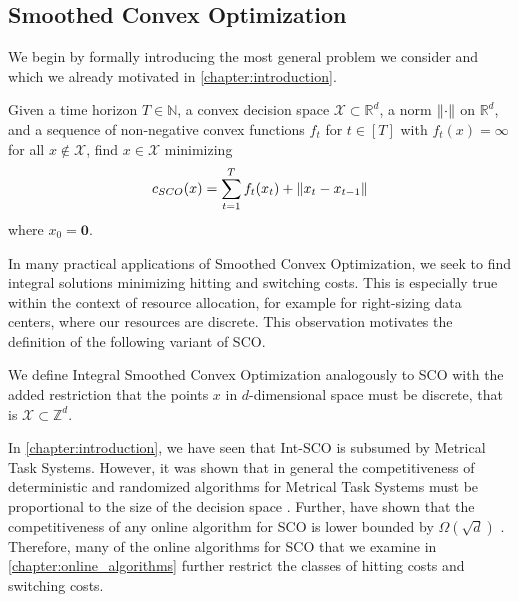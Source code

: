 \subsection{Smoothed Convex Optimization}

We begin by formally introducing the most general problem we consider and which we already motivated in \autoref{chapter:introduction}.

\begin{problem}
Given a time horizon $T \in \mathbb{N}$, a convex decision space $\mathcal{X} \subset \mathbb{R}^d$, a norm $\lVert\cdot\rVert$ on $\mathbb{R}^d$, and a sequence of non-negative convex functions $f_t$ for $t \in [T]$ with $f_t(x) = \infty$ for all $x \not\in \mathcal{X}$, find $x \in \mathcal{X}$ minimizing \begin{align*}
    c_{SCO}(x) = \sum_{t=1}^T f_t(x_t) + \lVert x_t - x_{t-1}\rVert
\end{align*}
where $x_0 = \mathbf{0}$.
\end{problem}

In many practical applications of Smoothed Convex Optimization, we seek to find integral solutions minimizing hitting and switching costs. This is especially true within the context of resource allocation, for example for right-sizing data centers, where our resources are discrete. This observation motivates the definition of the following variant of SCO.

\begin{problem}
We define Integral Smoothed Convex Optimization analogously to SCO with the added restriction that the points $x$ in $d$-dimensional space must be discrete, that is $\mathcal{X} \subset \mathbb{Z}^d$.
\end{problem}

In \autoref{chapter:introduction}, we have seen that Int-SCO is subsumed by Metrical Task Systems. However, it was shown that in general the competitiveness of deterministic and randomized algorithms for Metrical Task Systems must be proportional to the size of the decision space \cite{Blum1992, Borodin1992}. Further, \citeauthor*{Chen2018} have shown that the competitiveness of any online algorithm for SCO is lower bounded by $\Omega(\sqrt{d})$ \cite{Chen2018}. Therefore, many of the online algorithms for SCO that we examine in \autoref{chapter:online_algorithms} further restrict the classes of hitting costs and switching costs.

